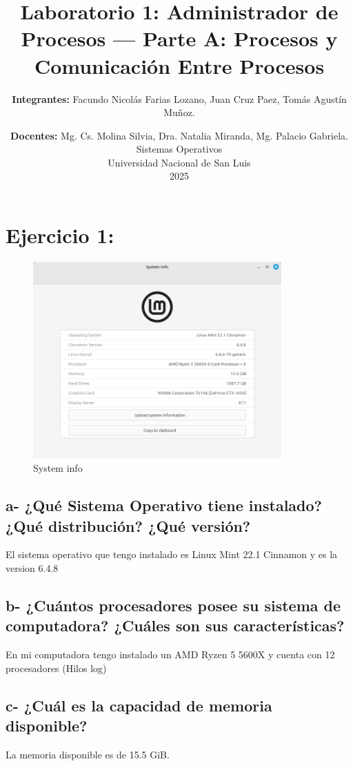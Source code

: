 \documentclass{article}
\title{\textbf{Laboratorio 1: }Administrador de Procesos --- Parte A\@: Procesos y Comunicación Entre Procesos}
\author{ \textbf{Integrantes: }
Facundo Nicolás Farias Lozano,
Juan Cruz Paez,
Tomás Agustín Muñoz.
}
\date{\textbf{Docentes: } 
Mg. Cs. Molina Silvia, Dra. Natalia Miranda, Mg. Palacio Gabriela.
  \\Sistemas Operativos\\ Universidad Nacional de San Luis\\2025
  }
\begin{document}
\maketitle


\section*{Ejercicio 1:}

\begin{figure}[h]
  \centering
  \includegraphics[width=0.85\textwidth]{resources/ej1a.png}
  \caption{System info}
\end{figure}

\subsection*{a- ¿Qué Sistema Operativo tiene instalado? ¿Qué distribución? ¿Qué versión?}
\noindent
El sistema operativo que tengo instalado es Linux Mint 22.1 Cinnamon y es la version 6.4.8

\subsection*{b- ¿Cuántos procesadores posee su sistema de computadora? ¿Cuáles son sus características?}
\noindent
En mi computadora tengo instalado un AMD Ryzen 5 5600X y cuenta con 12 procesadores (Hilos log)

\subsection*{c- ¿Cuál es la capacidad de memoria disponible?}
\noindent
La memoria disponible es de 15.5 GiB.
\end{document}
